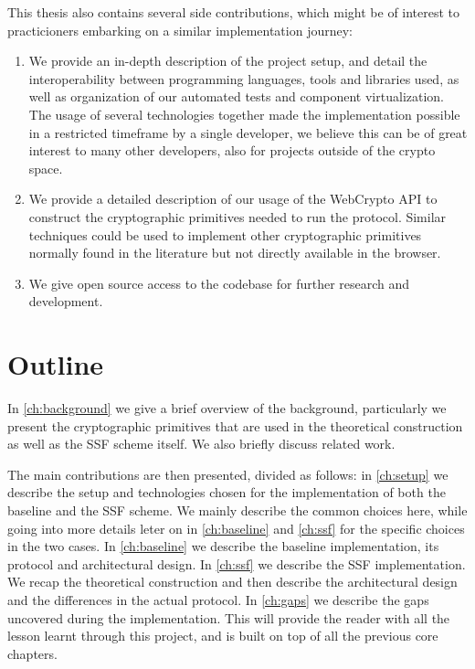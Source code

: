 This thesis also contains several side contributions, which might be of interest to
practicioners embarking on a similar implementation journey:
\begin{enumerate}
    \item We provide an in-depth description of the project setup, and detail the interoperability between programming languages, tools and libraries used, as well as organization of our automated tests and component virtualization. The usage of several technologies together made the implementation possible in a restricted timeframe by a single developer, we believe this can be of great interest to many other developers, also for projects outside of the crypto space. 
    \item We provide a detailed description of our usage of the WebCrypto API to construct the cryptographic primitives needed to run the protocol. Similar techniques could be used to implement other cryptographic primitives normally found in the literature but not directly available in the browser. 
    \item We give open source access to the codebase for further research and development.
\end{enumerate}

\section{Outline}

In \cref{ch:background} we give a brief overview of the background, particularly 
we present the cryptographic primitives that are used in the theoretical construction 
as well as the SSF scheme itself. We also briefly discuss related work. 

The main contributions are then presented, divided as follows: 
in \cref{ch:setup} we describe the setup and technologies chosen for the implementation of both the baseline and the SSF scheme. We mainly describe the common choices here, while going into more details leter on in \cref{ch:baseline} and \cref{ch:ssf} for the specific choices in the two cases.
In \cref{ch:baseline} we describe the baseline implementation, its protocol and architectural design.
In \cref{ch:ssf} we describe the SSF implementation. We recap the theoretical construction and then describe the architectural design and the differences in the actual protocol.
In \cref{ch:gaps} we describe the gaps uncovered during the implementation. This will provide the reader with all the lesson learnt through this project, and is built on top of all the previous core chapters.

